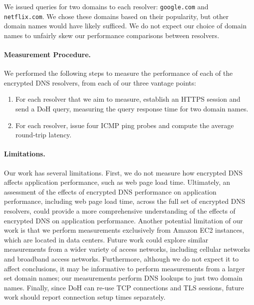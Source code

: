 We issued queries for two domains to each resolver: \texttt{google.com} and
\texttt{netflix.com}.  We chose these domains based on their popularity, but
other domain names would have likely sufficed.  We do not expect our choice of
domain names to unfairly skew our performance comparisons between resolvers.

\paragraph{Measurement Procedure.} We performed the following steps to measure
the performance of each of the encrypted DNS resolvers, from each of our three vantage points:
\begin{enumerate} 
        \item For each
            resolver that we aim to measure, establish an HTTPS session and
            send a DoH query, measuring the query response time for two
            domain names.
    \item For each resolver, issue four ICMP ping
            probes and compute the average round-trip latency. 
\end{enumerate}

\paragraph{Limitations.} Our work has several limitations.
First, we do not measure how encrypted DNS affects application
performance, such as web page load time. Ultimately, an assessment of the
effects of encrypted DNS performance on application performance, including web
page load time, across the full set of encrypted DNS resolvers, could provide
a more comprehensive understanding of the effects of encrypted DNS on
application performance.  Another potential limitation of our work is that we
perform measurements exclusively from Amazon EC2 instances, which are located
in data centers. Future work could explore similar measurements from a wider
variety of access networks, including cellular networks and broadband access
networks.  Furthermore, although we do not expect it to affect conclusions, it may
be informative to perform measurements from a larger set domain names; our
measurements perform DNS lookups to just two domain names.
Finally, since DoH can re-use TCP connections and TLS sessions, future work 
should report connection setup times separately.

